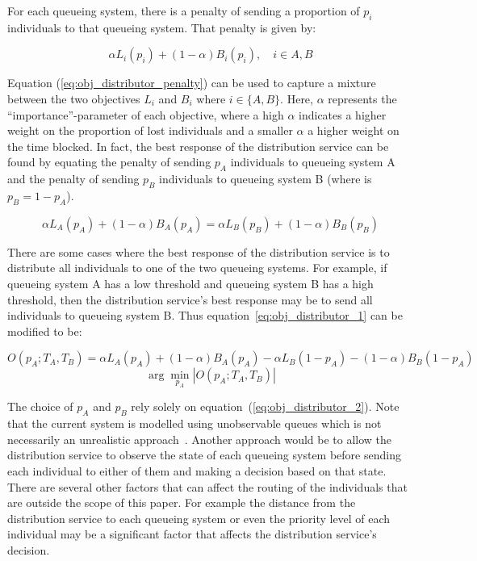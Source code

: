 For each queueing system, there is a penalty of sending a proportion of \(p_i\)
individuals to that queueing system.
That penalty is given by:

\begin{equation}\label{eq:obj_distributor_penalty}
    \alpha L_i(p_i) + (1 - \alpha) B_i(p_i), \quad i \in {A, B}
\end{equation}

Equation (\ref{eq:obj_distributor_penalty}) can be used to capture a mixture
between the two objectives \(L_i\) and \(B_i\) where \(i \in \{A, B\}\).
Here, \(\alpha\) represents the ``importance''-parameter of each objective,
where a high \(\alpha\) indicates a higher weight on the proportion of lost
individuals and a smaller \(\alpha\) a higher weight on the time blocked.
In fact, the best response of the distribution service can be found by equating
the penalty of sending \(p_A\) individuals to queueing system A and the penalty
of sending \(p_B\) individuals to queueing system B (where is \(p_B = 1-p_A\)).

\begin{equation}\label{eq:obj_distributor_1}
    \alpha L_A(p_A) + (1 - \alpha) B_A(p_A) =
    \alpha L_B(p_B) + (1 - \alpha) B_B(p_B)
\end{equation}

There are some cases where the best response of the distribution service is
to distribute all individuals to one of the two queueing systems.
For example, if queueing system A has a low threshold and queueing system B
has a high threshold, then the distribution service's best response may be to
send all individuals to queueing system B.
Thus equation~\ref{eq:obj_distributor_1} can be modified to be:

\begin{equation*}
    O(p_A; T_A, T_B) = \alpha L_A(p_A) + (1 - \alpha) B_A(p_A) -
    \alpha L_B(1 - p_A) - (1 - \alpha)B_B(1 - p_A)
\end{equation*}
\begin{equation}\label{eq:obj_distributor_2}
    \arg \min_{p_A} |O(p_A; T_A, T_B)|
\end{equation}


The choice of \(p_A\) and \(p_B\) rely solely on
equation~(\ref{eq:obj_distributor_2}).
Note that the current system is modelled using unobservable queues which is not
necessarily an unrealistic approach~\cite{unobservablequeue}.
Another approach would be to allow the distribution service to observe the
state of each queueing system before sending each individual to either of them
and making a decision based on that state.
There are several other factors that can affect the routing of the
individuals that are outside the scope of this paper.
For example the distance from the distribution service to each queueing system
or even the priority level of each individual may be a significant factor that
affects the distribution service's decision.



